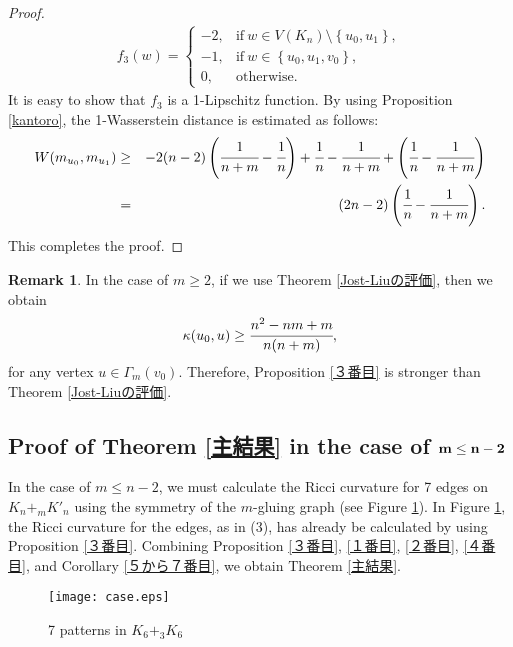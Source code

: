 \documentclass[leqno,12pt]{amsart} %
\theoremstyle{plain} %
\theoremstyle{definition} %
\newtheorem{remark}[theorem]{\indent\sc Remark}
\begin{document}
\begin{proof}
\begin{eqnarray*}
f_3(w)=
\begin{cases}
-2, & \mathrm{if}\ w \in V(K_n) \setminus \left\{ u_0, u_1 \right\},\\
-1, & \mathrm{if}\ w \in \left\{ u_0, u_1, v_0 \right\},\\
0, & \mathrm{otherwise}.
\end{cases}
\end{eqnarray*}
It is easy to show that $f_3$ is a 1-Lipschitz function. By using Proposition \ref{kantoro}, the 1-Wasserstein distance is estimated as follows:
\begin{eqnarray*}
W(m_{u_0}, m_{u_1}) &\geq& -2(n - 2) \left(\cfrac{1}{n+m} - \cfrac{1}{n} \right) + \cfrac{1}{n} - \cfrac{1}{n+m} + \left( \cfrac{1}{n} - \cfrac{1}{n+m} \right) \\
&=& (2n-2) \left( \cfrac{1}{n} - \cfrac{1}{n+m} \right).
\end{eqnarray*}
This completes the proof.
\end{proof}
\begin{remark}
\label{example1}
In the case of $m \geq 2$, if we use Theorem \ref{Jost-Liuの評価}, then we obtain
\begin{eqnarray*}
\kappa(u_0, u) \geq \cfrac{n^2 - nm + m}{n(n+m)},
\end{eqnarray*}
for any vertex $u \in \Gamma_m (v_0)$. Therefore, Proposition \ref{３番目} is stronger than Theorem \ref{Jost-Liuの評価}.
\end{remark}



\subsection{Proof of Theorem \ref{主結果} in the case of $\bf m \leq n-2$}
In the case of $m \leq n-2$, we must calculate the Ricci curvature for 7 edges on $K_{n} +_{m} K'_{n}$ using the symmetry of the $m$-gluing graph (see Figure \ref{case}). In Figure \ref{case}, the Ricci curvature for the edges, as in (3), has already be calculated by using Proposition \ref{３番目}. Combining Proposition \ref{３番目}, \ref{１番目}, \ref{２番目}, \ref{４番目}, and Corollary \ref{５から７番目}, we obtain Theorem \ref{主結果}.
  \begin{figure}[h]
     \begin{center} 
     \texttt{[image: case.eps]}
     \caption{7 patterns in $K_{6} +_{3} K_{6}$}
     \label{case} %
     \end{center}
    \end{figure} 
\end{document}

